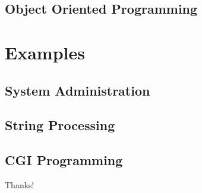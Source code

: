\documentclass[UTF8]{beamer}
\begin{document}
\subsection{Object Oriented Programming}

\section{Examples}

\subsection{System Administration}

\subsection{String Processing}

\subsection{CGI Programming}

\begin{frame}
  \centerline{\Huge{Thanks!}}
\end{frame}
\end{document}
